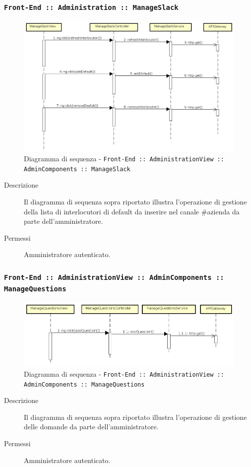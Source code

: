 \documentclass[../DefinizioneDiProdotto_v3.0.0.tex]{subfiles}
\begin{document}
\subsubsection{\texttt{Front-End :: Administration :: ManageSlack}}
\begin{figure}[!h]
	\centering
	\includegraphics[width=\textwidth]{DiagrammiSequenza/Front-End/AdministrationView/ManageSlack.png}
	\caption{Diagramma di sequenza - \texttt{Front-End :: AdministrationView :: AdminComponents :: ManageSlack }}
\end{figure}
\begin{description}
	\item [Descrizione] Il diagramma di sequenza sopra riportato illustra l'operazione di gestione della lista di interlocutori di default da inserire nel canale \#azienda da parte dell'amministratore.
	\item [Permessi] Amministratore autenticato.
\end{description}

\subsubsection{\texttt{Front-End :: AdministrationView :: AdminComponents :: ManageQuestions}}
\begin{figure}[!h]
	\centering
	\includegraphics[width=\textwidth]{DiagrammiSequenza/Front-End/AdministrationView/ManageQuestions.png}
	\caption{Diagramma di sequenza - \texttt{Front-End :: AdministrationView :: AdminComponents :: ManageQuestions }}
\end{figure}
\begin{description}
	\item [Descrizione] Il diagramma di sequenza sopra riportato illustra l'operazione di gestione delle domande da parte dell'amministratore.
	\item [Permessi] Amministratore autenticato.
\end{description}
\end{document}
